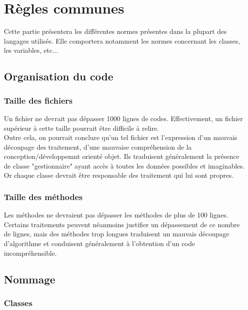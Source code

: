 
\section{Règles communes}

Cette partie présentera les différentes normes présentes dans la plupart des langages utilisés. Elle comportera notamment les normes concernant les classes, les variables, etc...

\subsection{Organisation du code}

\subsubsection{Taille des fichiers}
Un fichier ne devrait pas dépasser 1000 lignes de codes. Effectivement, un fichier supérieur à cette taille pourrait être difficile à relire.\\
Outre cela, on pourrait conclure qu'un tel fichier est l'expression d'un mauvais découpage des traitement, d'une mauvaise compréhension de la conception/développemnt orienté objet. Ils traduisent généralement la présence de classe "gestionnaire" ayant accès à toutes les données possibles et imaginables. Or chaque classe devrait être responsable des traitement qui lui sont propres.

\subsubsection{Taille des méthodes}
Les méthodes ne devraient pas dépasser les méthodes de plus de 100 lignes. Certains traitements peuvent néanmoins justifier un dépassement de ce nombre de lignes, mais des méthodes trop longues traduisent un mauvais découpage d'algorithme et conduisent généralement à l'obtention d'un code incompréhensible.

\subsection{Nommage}

\subsubsection{Classes}
\label{nommageClasses}

